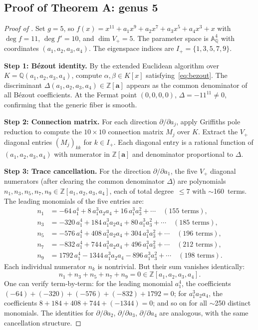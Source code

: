 \documentclass[11pt]{article}
\theoremstyle{plain}
\theoremstyle{definition}
\theoremstyle{remark}
\newcommand{\ZZ}{\mathbb{Z}}
\newcommand{\QQ}{\mathbb{Q}}
\newcommand{\Aff}{\mathbb{A}}
\begin{document}
\subsection{Proof of Theorem A: genus 5}
\label{sec:proof-A}

\begin{proof}[Proof of ]
Set $g = 5$, so $f(x) = x^{11} + a_1 x^9 + a_2 x^7 + a_3 x^5 + a_4 x^3 + x$
with $\deg f = 11$, $\deg f' = 10$, and $\dim V_+ = 5$.
The parameter space is $\Aff^4_\QQ$ with coordinates $(a_1, a_2, a_3, a_4)$.
The eigenspace indices are $I_+ = \{1, 3, 5, 7, 9\}$.

\medskip\noindent\textbf{Step 1: B\'ezout identity.}
By the extended Euclidean algorithm over $K = \QQ(a_1, a_2, a_3, a_4)$,
compute $\alpha, \beta \in K[x]$ satisfying~\eqref{eq:bezout}.
The discriminant $\Delta(a_1,a_2,a_3,a_4) \in \ZZ[\mathbf{a}]$ appears
as the common denominator of all B\'ezout coefficients.
At the Fermat point $(0,0,0,0)$, $\Delta = -11^{11} \neq 0$, confirming
that the generic fiber is smooth.

\medskip\noindent\textbf{Step 2: Connection matrix.}
For each direction $\partial/\partial a_j$, apply Griffiths pole reduction
to compute the $10 \times 10$ connection matrix $M_j$ over $K$.
Extract the $V_+$ diagonal entries $(M_j)_{kk}$ for $k \in I_+$.
Each diagonal entry is a rational function of $(a_1, a_2, a_3, a_4)$ with
numerator in $\ZZ[\mathbf{a}]$ and denominator proportional to $\Delta$.

\medskip\noindent\textbf{Step 3: Trace cancellation.}
For the direction $\partial/\partial a_1$, the five $V_+$ diagonal numerators
(after clearing the common denominator $\Delta$) are polynomials
$n_1, n_3, n_5, n_7, n_9 \in \ZZ[a_1, a_2, a_3, a_4]$, each of total degree~$\leq 7$
with $\sim$160~terms.  The leading monomials of the five entries are:
\begin{align*}
  n_1 &= -64\,a_1^4 + 8\,a_1^3 a_2 a_4 + 16\,a_1^3 a_3^2 + \cdots \quad
    (155 \text{ terms}), \\
  n_3 &= -320\,a_1^4 + 184\,a_1^3 a_2 a_4 + 80\,a_1^3 a_3^2 + \cdots \quad
    (185 \text{ terms}), \\
  n_5 &= -576\,a_1^4 + 408\,a_1^3 a_2 a_4 + 304\,a_1^3 a_3^2 + \cdots \quad
    (196 \text{ terms}), \\
  n_7 &= -832\,a_1^4 + 744\,a_1^3 a_2 a_4 + 496\,a_1^3 a_3^2 + \cdots \quad
    (212 \text{ terms}), \\
  n_9 &= 1792\,a_1^4 - 1344\,a_1^3 a_2 a_4 - 896\,a_1^3 a_3^2 + \cdots \quad
    (198 \text{ terms}).
\end{align*}
Each individual numerator $n_k$ is nontrivial.  But their sum vanishes identically:
\[
  n_1 + n_3 + n_5 + n_7 + n_9 = 0 \in \ZZ[a_1, a_2, a_3, a_4].
\]
One can verify term-by-term: for the leading monomial $a_1^4$, the coefficients
$(-64) + (-320) + (-576) + (-832) + 1792 = 0$;
for $a_1^3 a_2 a_4$, the coefficients
$8 + 184 + 408 + 744 + (-1344) = 0$; and so on for all $\sim$250 distinct
monomials.  The identities for $\partial/\partial a_2$, $\partial/\partial a_3$,
$\partial/\partial a_4$ are analogous, with the same cancellation structure.


\end{proof}
\end{document}
